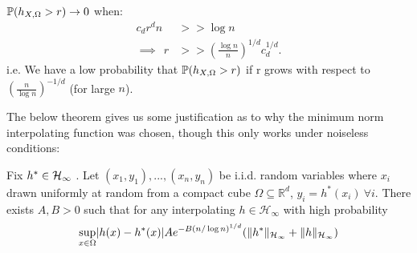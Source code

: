 \documentclass[twoside]{memoir}
\begin{document}
$\mathbb{P}(h_{X,\Omega} > r) \rightarrow 0$ when:
\begin{equation*}
\begin{split}
c_dr^dn &>> \log n\\
\implies ~~ r &>> (\frac{\log n}{n})^{1/d} c_d^{1/d}.
\end{split}
\end{equation*}
i.e. We have a low probability that $\mathbb{P}(h_{X,\Omega} > r)$ if r grows with respect to $(\frac{n}{\log n})^{-1/d}$ (for large $n$).  



The below theorem gives us some justification as to why the minimum norm interpolating function was chosen, though this only works under noiseless conditions:
\begin{thm} \label{thm:approx}
	Fix $h^* \in \mathcal{H}_\infty $  .
	Let $(x_1,y_1), ..., (x_n,y_n)$ be i.i.d. random variables where $x_i$ drawn uniformly at random from a compact cube $\Omega \subseteq \mathbb{R}^d $,
	$y_i = h^*(x_i) \: \forall i$. There exists $A, B > 0$ such that for any interpolating $h \in \mathcal{H}_\infty $ with high probability
	\begin{equation*}
	\sup_{x \in \Omega} \lvert h(x) - h^*(x)\rvert A e^{-B(n/ \log n)^{1/d}} (\lVert h^*\rVert_{\mathcal{H}_\infty} + \lVert h\rVert_{\mathcal{H}_\infty})
	\end{equation*}
\end{thm}
\end{document}
